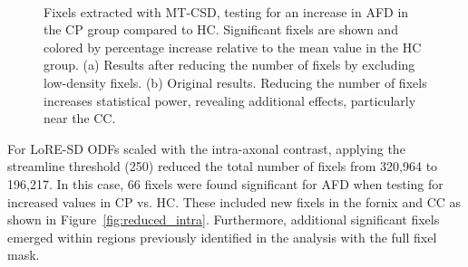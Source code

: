 \begin{figure}[H]
    \centering
     \\[1em] %
    \caption{Fixels extracted with MT-CSD, testing for an increase in AFD in the CP group compared to HC. Significant fixels are shown and colored by percentage increase relative to the mean value in the HC group. (a) Results after reducing the number of fixels by excluding low-density fixels. (b) Original results. Reducing the number of fixels increases statistical power, revealing additional effects, particularly near the CC.}
    \label{fig:reduced_MT}
\end{figure}


For LoRE-SD ODFs scaled with the intra-axonal contrast, applying the streamline threshold (250) reduced the total number of fixels from 320,964 to 196,217. In this case, 66 fixels were found significant for AFD when testing for increased values in CP vs. HC. These included new fixels in the fornix and CC as shown in Figure~\ref{fig:reduced_intra}. Furthermore, additional significant fixels emerged within regions previously identified in the analysis with the full fixel mask.


